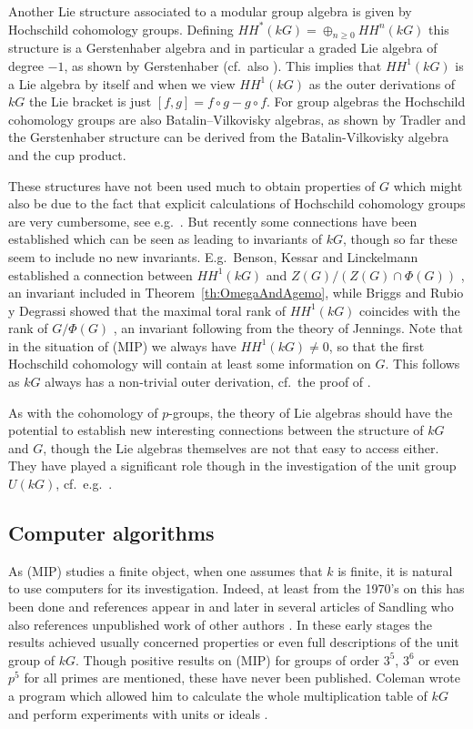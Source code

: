 \documentclass[11pt, a4paper]{amsart}
\theoremstyle{definition}
\begin{document}
Another Lie structure associated to a modular group algebra is given by Hochschild cohomology groups. Defining $HH^*(kG) = \oplus_{n \geq 0}HH^n(kG)$ this structure is a Gerstenhaber algebra and in particular a graded Lie algebra of degree $-1$, as shown by Gerstenhaber \cite{Gerstenhaber} (cf.\ also \cite[Section 1.4]{WitherspoonHochschildBook}). This implies that $HH^1(kG)$ is a Lie algebra by itself and when we view $HH^1(kG)$ as the outer derivations of $kG$ the Lie bracket is just $[f,g] = f \circ g - g \circ f$. 
For group algebras the Hochschild cohomology groups are also Batalin--Vilkovisky algebras, as shown by Tradler \cite{Tradler08} and the Gerstenhaber structure can be derived from the Batalin-Vilkovisky algebra and the cup product. 

These structures have not been used much to obtain properties of $G$ which might also be due to the fact that explicit calculations of Hochschild cohomology groups are very cumbersome, see e.g.\ \cite{SanchezFlores}. But recently some connections have been established which can be seen as leading to invariants of $kG$, though so far these seem to include no new invariants. E.g.\ Benson, Kessar and Linckelmann established a connection between $HH^1(kG)$ and $Z(G)/(Z(G) \cap \Phi(G))$ \cite{BensonKessarLinckelmann}, an invariant included in Theorem~\ref{th:OmegaAndAgemo}, while Briggs and Rubio y Degrassi showed that the maximal toral rank of $HH^1(kG)$ coincides with the rank of $G/\Phi(G)$  \cite[Proposition 5.12]{BriggsRubioYDegrassi}, an invariant following from the theory of Jennings. Note that in the situation of (MIP) we always have $HH^1(kG) \neq 0$, so that the first Hochschild cohomology will contain at least some information on $G$. This follows as $kG$ always has a non-trivial outer derivation, cf.\ the proof of \cite[Theorem 2.2]{FarkasGeissMarcos}.

As with the cohomology of $p$-groups, the theory of Lie algebras should have the potential to establish new interesting connections between the structure of $kG$ and $G$, though the Lie algebras themselves are not that easy to access either. They have played a significant role though in the investigation of the unit group $U(kG)$, cf.\ e.g.\ \cite{Shalev91}.

\subsection{Computer algorithms}\label{sec:computers}

As (MIP) studies a finite object, when one assumes that $k$ is finite, it is natural to use computers for its investigation. Indeed, at least from the 1970's on this has been done and references appear in \cite{MoranTench77, Ivory80} and later in several articles of Sandling who also references unpublished work of other authors \cite{Sandling84, Sandling89}. In these early stages the results achieved usually concerned properties or even full descriptions of the unit group of $kG$. Though positive results on (MIP) for groups of order $3^5$, $3^6$ or even $p^5$ for all primes are mentioned, these have never been published.
Coleman wrote a program which allowed him to calculate the whole multiplication table of $kG$ and perform experiments with units or ideals \cite{Coleman92}.
\end{document}
